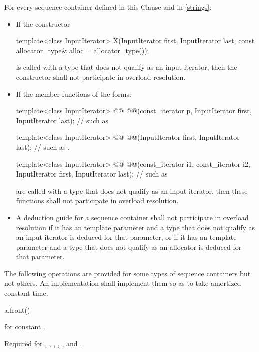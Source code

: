 \pnum
For every sequence container defined in this Clause and in \ref{strings}:
\begin{itemize}
\item If the constructor
\begin{codeblock}
template<class InputIterator>
  X(InputIterator first, InputIterator last,
    const allocator_type& alloc = allocator_type());
\end{codeblock}
is called with a type  that does not qualify as an input
iterator, then the constructor
shall not participate in overload resolution.

\item If the member functions of the forms:
\begin{codeblock}
template<class InputIterator>
  @@ @@(const_iterator p,
                InputIterator first, InputIterator last);       // such as 

template<class InputIterator>
  @@ @@(InputIterator first, InputIterator last);       // such as , 

template<class InputIterator>
  @@ @@(const_iterator i1, const_iterator i2,
                InputIterator first, InputIterator last);       // such as 
\end{codeblock}
are called with a type  that does not qualify as an input
iterator, then these functions
shall not participate in overload resolution.

\item A deduction guide for a sequence container shall not participate in overload resolution
if it has an  template parameter and a type that does not
qualify as an input iterator is deduced for that parameter,
or if it has an  template parameter and a type that does not
qualify as an allocator is deduced for that parameter.
\end{itemize}

\pnum
The following operations are provided for
some types of sequence containers but not others.
An implementation shall implement them so as to take amortized constant time.

\begin{itemdecl}
a.front()
\end{itemdecl}

\begin{itemdescr}
\pnum
\result
{} for constant .

\pnum
\returns
{}

\pnum
\remarks
Required for
,
,
,
,
, and
.
\end{itemdescr}

